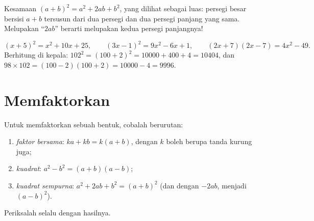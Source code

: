 \begin{omfigure}

{\small Kesamaan $(a+b)^2 = a^2 + 2ab + b^2$, yang dilihat sebagai
luas: persegi besar bersisi $a+b$ tersusun dari dua persegi dan dua
persegi panjang yang sama. Melupakan ``$2ab$'' berarti melupakan kedua
persegi panjangnya!}
\end{omfigure}

\begin{example}\label{ex:g9:algebra:identities}
\[
(x + 5)^2 = x^2 + 10x + 25, \qquad
(3x - 1)^2 = 9x^2 - 6x + 1, \qquad
(2x + 7)(2x - 7) = 4x^2 - 49 .
\]
Berhitung di kepala: $102^2 = (100 + 2)^2 = 10000 + 400 + 4 = 10404$,
dan $98 \times 102 = (100-2)(100+2) = 10000 - 4 = 9996$.
\end{example}

\section{Memfaktorkan}

\begin{method}[Memfaktorkan]\label{met:g9:algebra:factor}
Untuk memfaktorkan sebuah bentuk, cobalah berurutan:
\begin{enumerate}
  \item \emph{faktor bersama}: $ka + kb = k(a + b)$, dengan $k$ boleh
        berupa tanda kurung juga;
  \item \emph{ kuadrat}: $a^2 - b^2 = (a+b)(a-b)$;
  \item \emph{kuadrat sempurna}: $a^2 + 2ab + b^2 = (a+b)^2$ (dan
        dengan $-2ab$, menjadi $(a-b)^2$).
\end{enumerate}
Periksalah selalu dengan  hasilnya.
\end{method}

